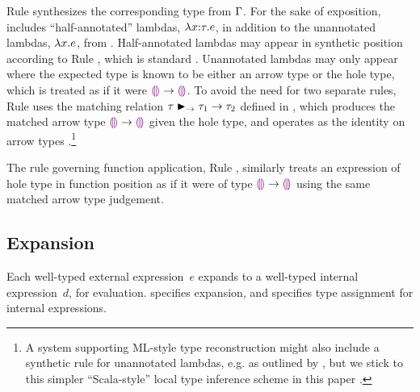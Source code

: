 Rule  synthesizes the corresponding type from $\Gamma$.
For the sake of exposition, \HazelnutLive includes ``half-annotated'' lambdas, $\lambda x{:}\tau.e$, in addition to the unannotated lambdas, $\lambda x.e$, from \Hazelnut.
%
Half-annotated lambdas may appear in synthetic position according to Rule , which is standard \cite{Chlipala:2005da}.
%
Unannotated lambdas may only appear where the expected type is known to be either an arrow type or the hole type, which is treated as if it were $\textcolor{violet}{\llparenthesis}\textcolor{violet}{\rrparenthesis} \rightarrow \textcolor{violet}{\llparenthesis}\textcolor{violet}{\rrparenthesis}$.
%
To avoid the need for two separate rules, Rule  uses the matching relation $\tau \blacktriangleright_{\rightarrow} \tau_1 \rightarrow \tau_2$ defined in , which produces the matched arrow type $\textcolor{violet}{\llparenthesis}\textcolor{violet}{\rrparenthesis} \rightarrow \textcolor{violet}{\llparenthesis}\textcolor{violet}{\rrparenthesis}$ given the hole type, and operates as the identity on arrow types \cite{DBLP:conf/snapl/SiekVCB15,DBLP:conf/popl/GarciaC15}.\footnote{A system supporting ML-style type reconstruction \cite{damas1982principal} might also include a synthetic rule for unannotated lambdas, e.g. as outlined by \citet{DBLP:conf/icfp/DunfieldK13}, but we stick to this simpler ``Scala-style'' local type inference scheme in this paper \cite{Pierce:2000ve,Odersky:2001lb}.}
%
%
%
%

The rule governing function application, Rule , similarly treats an expression of hole type in function position as if it were of type $\textcolor{violet}{\llparenthesis}\textcolor{violet}{\rrparenthesis} \rightarrow \textcolor{violet}{\llparenthesis}\textcolor{violet}{\rrparenthesis}$ using the same matched arrow type judgement.

\vspace{-4px}
\subsection{Expansion}
\label{sec:expansion}
\vspace{-1px}




Each well-typed external expression~$e$ expands to a well-typed internal expression~$d$, for evaluation.
%
 specifies expansion, and  specifies type assignment for internal expressions.
%


